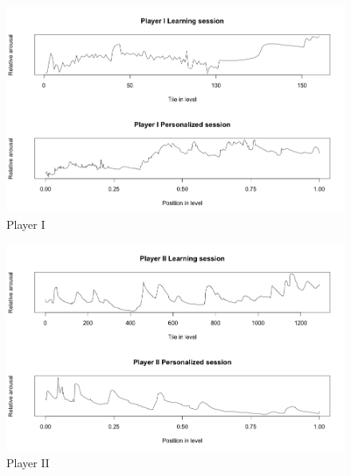 \documentclass{llncs}
\begin{document}
\begin{figure}
\centering
\includegraphics[scale=0.4]{movieStar.png}
\caption{Player I}
\label{fig:playerFirst}
\end{figure}
\begin{figure}
\centering
\includegraphics[scale=0.4]{nicklas.png}
\caption{Player II}
\label{fig:playerLast}
\end{figure}
\end{document}

